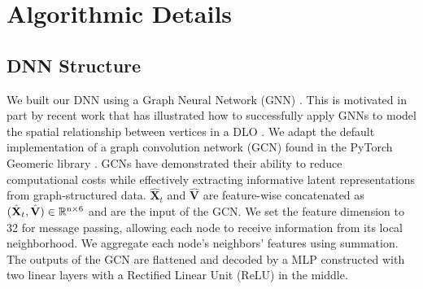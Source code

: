 \section{Algorithmic Details}
\label{appendix:methodology}
\subsection{DNN Structure}
\label{appendix:integration_NN}
We built our DNN using a Graph Neural Network (GNN) \cite{GNN}. This is motivated in part by recent work that has illustrated how to successfully apply GNNs to model the spatial relationship between vertices in a DLO \cite{GNN_baseline}. 
We adapt the default implementation of a graph convolution network (GCN) \cite{GCN} found in the PyTorch Geomeric library \cite{pytorch_geometric}. 
GCNs have demonstrated their ability to reduce computational costs while effectively extracting informative latent representations from graph-structured data. 
$\hat{\textbf{X}}_t$ and $\hat{\textbf{V}}$ are feature-wise concatenated as $(\hat{\textbf{X}}_t, \hat{\textbf{V}})\in\mathbb{R}^{\text{n}\times6}$ and are the input of the GCN. 
We set the feature dimension to 32 for message passing, allowing each node to receive information from its local neighborhood. 
We aggregate each node's neighbors' features using summation.
The outputs of the GCN are flattened and decoded by a MLP constructed with two linear layers with a Rectified Linear Unit (ReLU) in the middle. 
\label{appendix:DNN Structurey}



